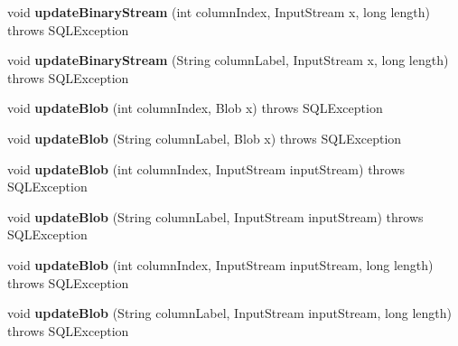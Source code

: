 \begin{DoxyCompactItemize}
void {\bfseries update\+Binary\+Stream} (int column\+Index, Input\+Stream x, long length)  throws S\+Q\+L\+Exception 
\item 
\mbox{\label{classsimpledb_1_1jdbc_1_1ResultSetAdapter_a7addc4a6e34d5bdd1a2c5a9dd3c3edff}} 
void {\bfseries update\+Binary\+Stream} (String column\+Label, Input\+Stream x, long length)  throws S\+Q\+L\+Exception 
\item 
\mbox{\label{classsimpledb_1_1jdbc_1_1ResultSetAdapter_af335ec5120021dde64c14193a0e639d2}} 
void {\bfseries update\+Blob} (int column\+Index, Blob x)  throws S\+Q\+L\+Exception 
\item 
\mbox{\label{classsimpledb_1_1jdbc_1_1ResultSetAdapter_aa8184fe6ad205485f3a8a3691a608b93}} 
void {\bfseries update\+Blob} (String column\+Label, Blob x)  throws S\+Q\+L\+Exception 
\item 
\mbox{\label{classsimpledb_1_1jdbc_1_1ResultSetAdapter_ac0def72182226049966c92d628478a75}} 
void {\bfseries update\+Blob} (int column\+Index, Input\+Stream input\+Stream)  throws S\+Q\+L\+Exception 
\item 
\mbox{\label{classsimpledb_1_1jdbc_1_1ResultSetAdapter_a61d27425174fc99cf7846a0e9edc6dba}} 
void {\bfseries update\+Blob} (String column\+Label, Input\+Stream input\+Stream)  throws S\+Q\+L\+Exception 
\item 
\mbox{\label{classsimpledb_1_1jdbc_1_1ResultSetAdapter_a34c9b294d247d4e2ed040afc44a0382b}} 
void {\bfseries update\+Blob} (int column\+Index, Input\+Stream input\+Stream, long length)  throws S\+Q\+L\+Exception 
\item 
\mbox{\label{classsimpledb_1_1jdbc_1_1ResultSetAdapter_abb6f9c338ceca01e0bfcde807d619d26}} 
void {\bfseries update\+Blob} (String column\+Label, Input\+Stream input\+Stream, long length)  throws S\+Q\+L\+Exception 
\item 
\mbox{\label{classsimpledb_1_1jdbc_1_1ResultSetAdapter_a0f01daf828762b2ace0319928ff304d1}} 

\end{DoxyCompactItemize}
